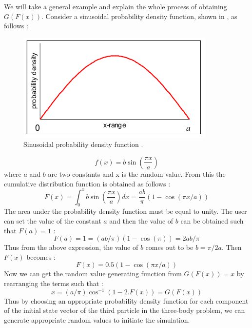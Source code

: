 We will take a general example and explain the whole process of obtaining $G(F(x))$. Consider a sinusoidal probability density function, shown in , as follows \cite{monteweb}:
%
\begin{figure}[h]
\centering
\captionsetup{justification=centering}
\includegraphics[scale=1]{pdf.png}
\caption{Sinusoidal probability density function \cite{monteweb}.}
\label{fig:pdf}
\end{figure}
\FloatBarrier
%
\begin{equation}
f(x) = b \sin \left( \frac{\pi x}{a} \right)
\end{equation}
%
where $a$ and $b$ are two constants and x is the random value. From this the cumulative distribution function is obtained as follows \cite{monteweb}:
\begin{equation}
F(x) = \int_0^x b \sin \left( \frac{\pi x}{a} \right) dx = \frac{ab}{\pi}(1 - \cos(\pi x/a))
\end{equation}
%
The area under the probability density function must be equal to unity. The user can set the value of the constant $a$ and then the value of $b$ can be obtained such that $F(a) = 1$ \cite{monteweb}:
\begin{equation}
F(a) = 1 = (ab/\pi) (1 - \cos(\pi)) = 2ab/\pi
\end{equation}
%
Thus from the above expression, the value of $b$ comes out to be $b = \pi/2a$. Then $F(x)$ becomes \cite{monteweb}:
\begin{equation}
F(x) = 0.5 (1 - \cos(\pi x/a))
\end{equation}
%
Now we can get the random value generating function from $G(F(x)) = x$ by rearranging the terms such that \cite{monteweb}:
\begin{equation}
x = (a/\pi) \cos^{-1} (1 - 2.F(x)) = G(F(x))
\end{equation}
%
Thus by choosing an appropriate probability density function for each component of the initial state vector of the third particle in the three-body problem, we can generate appropriate random values to initiate the simulation.

